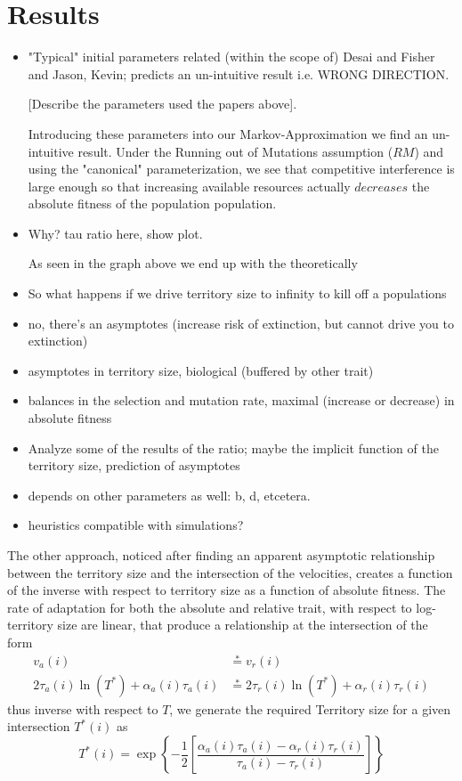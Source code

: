 \documentclass[9pt,twocolumn,twoside]{article}
\begin{document}
\section{Results}
\begin{itemize}
    \item "Typical" initial parameters related (within the scope of) Desai and Fisher and Jason, Kevin; predicts an un-intuitive result i.e. WRONG DIRECTION.
    
    [Describe the parameters used the papers above].
    
    Introducing these parameters into our Markov-Approximation we find an un-intuitive result. Under the Running out of Mutations assumption ($RM$) and using the "canonical" parameterization, we see that competitive interference is large enough so that increasing available resources actually $decreases$ the absolute fitness of the population population.
    
    \item Why? tau ratio here, show plot.
    
    As seen in the graph above we end up with the theoretically 
    \item So what happens if we drive territory size to infinity to kill off a populations
    \item no, there's an asymptotes (increase risk of extinction, but cannot drive you to extinction)
    \item asymptotes in territory size, biological (buffered by other trait)
    \item balances in the selection and mutation rate, maximal (increase or decrease) in absolute fitness
    \item Analyze some of the results of the ratio; maybe the implicit function of the territory size, prediction of asymptotes
    \item depends on other parameters as well: b, d, etcetera.
    \item heuristics compatible with simulations?
\end{itemize}

The other approach, noticed after finding an apparent asymptotic relationship between the territory size and the intersection of the velocities, creates a function of the inverse with respect to territory size as a function of absolute fitness. The rate of adaptation for both the absolute and relative trait, with respect to log-territory size are linear, that produce a relationship at the intersection of the form
\begin{align*}
    v_{a}(i) & \stackrel{*}{=} v_{r}(i) \\
    2 \tau_{a}(i) \ln (T^*) + \alpha_{a}(i) \tau_{a}(i) & \stackrel{*}{=}
    2 \tau_{r}(i) \ln (T^*) + \alpha_{r}(i) \tau_{r}(i)
\end{align*}
thus inverse with respect to $T$, we generate the required Territory size for a given intersection $T^*(i)$ as
$$ T^{*}(i) =  \exp \left \{-\frac{1}{2} \left[ \frac{\alpha_{a}(i) \tau_{a}(i) - \alpha_{r}(i) \tau_{r}(i)}{ \tau_{a}(i) - \tau_{r}(i)} \right] \right \}$$
    
\end{document}
